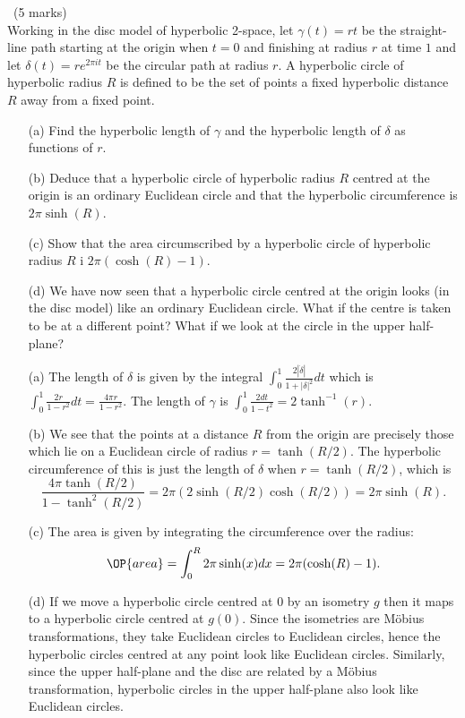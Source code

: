 \documentclass[12pt]{article}
\begin{document}
\begin{question}\ (5 marks)\\
  Working in the disc model of hyperbolic 2-space, let $\gamma(t)=rt$ be the straight-line path starting at the origin when $t=0$ and finishing at radius $r$ at time $1$ and let $\delta(t)=re^{2\pi it}$ be the circular path at radius $r$. A hyperbolic circle of hyperbolic radius $R$ is defined to be the set of points a fixed hyperbolic distance $R$ away from a fixed point.
  \begin{enumerate}
  \item[(a)] Find the hyperbolic length of $\gamma$ and the hyperbolic length of $\delta$ as functions of $r$.
  \item[(b)] Deduce that a hyperbolic circle of hyperbolic radius $R$ centred at the origin is an ordinary Euclidean circle and that the hyperbolic circumference is $2\pi\sinh(R)$.
  \item[(c)] Show that the area circumscribed by a hyperbolic circle of hyperbolic radius $R$ i $2\pi(\cosh(R)-1)$.
  \item[(d)] We have now seen that a hyperbolic circle centred at the origin looks (in the disc model) like an ordinary Euclidean circle. What if the centre is taken to be at a different point? What if we look at the circle in the upper half-plane?
  \end{enumerate}
\end{question}
\begin{answer}
  \begin{enumerate}
  \item[(a)] The length of $\delta$ is given by the integral $\int_0^1\frac{2|\dot{\delta}|}{1+|\delta|^2}dt$ which is $\int_0^1\frac{2r}{1-r^2}dt=\frac{4\pi r}{1-r^2}$. The length of $\gamma$ is $\int_0^1\frac{2dt}{1-t^2}=2\tanh^{-1}(r)$.
  \item[(b)] We see that the points at a distance $R$ from the origin are precisely those which lie on a Euclidean circle of radius $r=\tanh(R/2)$. The hyperbolic circumference of this is just the length of $\delta$ when $r=\tanh(R/2)$, which is
    \[\frac{4\pi\tanh(R/2)}{1-\tanh^2(R/2)}=2\pi(2\sinh(R/2)\cosh(R/2))=2\pi\sinh(R).\]
  \item[(c)] The area is given by integrating the circumference over the radius:
    \[\OP{area}=\int_0^R2\pi\sinh(x)dx=2\pi(\cosh(R)-1).\]
  \item[(d)] If we move a hyperbolic circle centred at $0$ by an isometry $g$ then it maps to a hyperbolic circle centred at $g(0)$. Since the isometries are M\"obius transformations, they take Euclidean circles to Euclidean circles, hence the hyperbolic circles centred at any point look like Euclidean circles. Similarly, since the upper half-plane and the disc are related by a M\"obius transformation, hyperbolic circles in the upper half-plane also look like Euclidean circles.
  \end{enumerate}
\end{answer}
\end{document}
